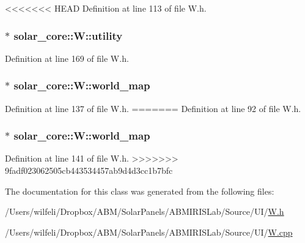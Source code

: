 <<<<<<< HEAD
Definition at line 113 of file W.\+h.

\hypertarget{classsolar__core_1_1_w_a6d6fa51d4bdc40dac8b76aa4967030b5}{}
\subsubsection[{utility}]{$\ast$ solar\+\_\+core\+::\+W\+::utility}\label{classsolar__core_1_1_w_a6d6fa51d4bdc40dac8b76aa4967030b5}


Definition at line 169 of file W.\+h.

\hypertarget{classsolar__core_1_1_w_a8ed6f1aa7fd4ef2c3488147b38a670b7}{}
\subsubsection[{world\+\_\+map}]{$\ast$ solar\+\_\+core\+::\+W\+::world\+\_\+map}\label{classsolar__core_1_1_w_a8ed6f1aa7fd4ef2c3488147b38a670b7}


Definition at line 137 of file W.\+h.
=======
Definition at line 92 of file W.\+h.

\hypertarget{classsolar__core_1_1_w_a8ed6f1aa7fd4ef2c3488147b38a670b7}{}
\subsubsection[{world\+\_\+map}]{$\ast$ solar\+\_\+core\+::\+W\+::world\+\_\+map\hspace{0.3cm}{\ttfamily [protected]}}\label{classsolar__core_1_1_w_a8ed6f1aa7fd4ef2c3488147b38a670b7}


Definition at line 141 of file W.\+h.
>>>>>>> 9fadf023062505cb443534457ab9d4d3cc1b7bfc



The documentation for this class was generated from the following files\+:\begin{DoxyCompactItemize}
\item 
/\+Users/wilfeli/\+Dropbox/\+A\+B\+M/\+Solar\+Panels/\+A\+B\+M\+I\+R\+I\+S\+Lab/\+Source/\+U\+I/\hyperlink{_w_8h}{W.\+h}\item 
/\+Users/wilfeli/\+Dropbox/\+A\+B\+M/\+Solar\+Panels/\+A\+B\+M\+I\+R\+I\+S\+Lab/\+Source/\+U\+I/\hyperlink{_w_8cpp}{W.\+cpp}\end{DoxyCompactItemize}
